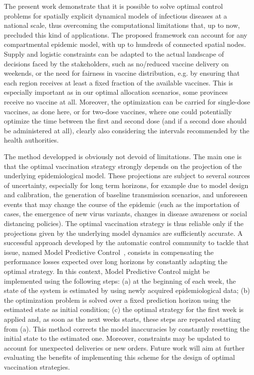 The present work demonstrate that it is possible to solve optimal control problems for spatially explicit dynamical models of infectious diseases at a national scale, thus overcoming the computational limitations that, up to now, precluded this kind of applications. The proposed framework can account for any compartmental epidemic model, with up to hundreds of connected spatial nodes. Supply and logistic constraints can be adapted to the actual landscape of decisions faced by the stakeholders, such as no/reduced vaccine delivery on weekends, or the need for fairness in vaccine distribution, e.g. by ensuring that each region receives at least a fixed fraction of the available vaccines. This is especially important as in our optimal allocation scenarios, some provinces receive no vaccine at all. Moreover, the optimization can be carried for single-dose vaccines, as done here, or for two-dose vaccines, where one could potentially optimize the time between the first and second dose (and if a second dose should be administered at all), clearly also considering the intervals recommended by the health authorities.

The method developped is obviously not devoid of limitations. The main one is that the optimal vaccination strategy strongly depends on the projection of the underlying epidemiological model. These projections are subject to several sources of uncertainty, especially for long term horizons, for example due to model design and calibration\cite{Cramer:EvaluationIndividualEnsemble:2021}, the generation of baseline transmission scenarios, and unforeseen events that may change the course of the epidemic (such as the importation of cases, the emergence of new virus variants, changes in disease awareness or social distancing policies). The optimal vaccination strategy is thus reliable only if the projections given by the underlying model dynamics are sufficiently accurate. A successful approach developed by the automatic control community to tackle that issue, named Model Predictive Control~\cite{Rawlings:ModelPredictiveControl:2017}, consists in compensating the performance losses expected over long horizons by constantly adapting the optimal strategy. In this context, Model Predictive Control might be implemented using the following steps: (a) at the beginning of each week, the state of the system is estimated by using newly acquired epidemiological data; (b) the optimization problem is solved over a fixed prediction horizon using the estimated state as initial condition; (c) the optimal strategy for the first week is applied and, as soon as the next weeks starts, these steps are repeated starting from (a). This method corrects the model inaccuracies by constantly resetting the initial state to the estimated one. Moreover, constraints may be updated to account for unexpected deliveries or new orders. Future work will aim at further evaluating the benefits of implementing this scheme for the design of optimal vaccination strategies.

